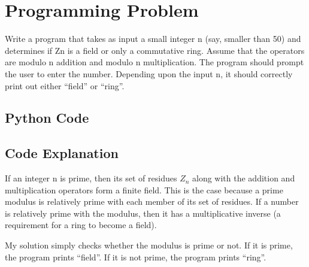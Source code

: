 \documentclass[11pt]{article}
\begin{document}
\pagebreak

\section{Programming Problem}

Write a program that takes as input a small integer n (say, smaller than 50) and determines if Zn is a field or only a commutative ring. Assume that the operators are modulo n addition and modulo n multiplication. The program should prompt the user to enter the number. Depending upon the input n, it should correctly print out either ``field'' or ``ring''.

\subsection{Python Code}

\pagebreak

\subsection{Code Explanation}
If an integer n is prime, then its set of residues $Z_n$ along with the addition and multiplication operators form a finite field. This is the case because a prime modulus is relatively prime with each member of its set of residues. If a number is relatively prime with the modulus, then it has a multiplicative inverse (a requirement for a ring to become a field).

My solution simply checks whether the modulus is prime or not. If it is prime, the program prints ``field''. If it is not prime, the program prints ``ring''.
\end{document}
